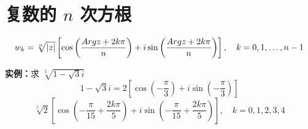 \section{复数的 $n$ 次方根}
\begin{tcolorbox}[colframe=teal!60!black, colback=teal!5!white, leftrule=3pt]
	$$w_k = \sqrt[n]{|z|} \left[ \cos\left(\frac{Arg z + 2k\pi}{n}\right) + i\sin\left(\frac{Arg z + 2k\pi}{n}\right) \right], \quad k=0, 1, \dots, n-1$$
\end{tcolorbox}

\noindent\textbf{实例：}求 $\sqrt[5]{1-\sqrt{3}i}$
$$1-\sqrt{3}i = 2\left[\cos\left(-\frac{\pi}{3}\right) + i\sin\left(-\frac{\pi}{3}\right)\right]$$
$$\sqrt[5]{2} \left[\cos\left(-\frac{\pi}{15} + \frac{2k\pi}{5}\right) + i\sin\left(-\frac{\pi}{15} + \frac{2k\pi}{5}\right)\right], \quad k=0,1,2,3,4$$